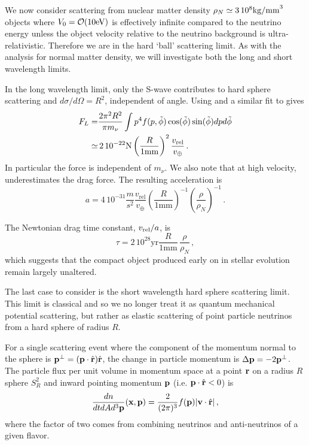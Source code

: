We now consider scattering from nuclear matter density $\rho_N\simeq 3 \, 10^{8}{\rm kg/mm}^3$ objects where $V_0={\cal O}(10\text{eV})$ is effectively infinite compared to the neutrino energy unless the object velocity relative to the neutrino background is ultra-relativistic.  Therefore we are in the hard `ball' scattering limit. As with the analysis for normal matter density, we will investigate both the long and short wavelength limits. 

In the long wavelength limit, only the S-wave contributes to hard sphere scattering and $d\sigma/d\Omega=R^2$, independent of angle. Using  and a similar fit to  gives
\begin{align}\label{FLHard}
F_L=&\frac{2\pi^2R^2}{\pi m_\nu} \int p^4 f(p,\tilde\phi) \cos(\tilde\phi) \sin(\tilde\phi) dpd\tilde\phi\notag\\
\simeq &\, 2\, 10^{-22}{\rm N}\left(\frac{R}{1\text{mm}}\right)^2\frac{v_{\text{rel}}}{v_\oplus}\,.
\end{align}
In particular the force is independent of $m_\nu$.  We also note that at high velocity,   underestimates the drag force. The resulting acceleration is
\begin{equation}
a=4\, 10^{-31}\frac{m}{s^2}\frac{v_{\text{rel}} }{v_\oplus}\! \left(\frac{R}{1\text{mm}}\right)^{-1}\!\!\left(\frac{\rho}{\rho_N}\right)^{-1}\,.\!\!
\end{equation}

The Newtonian drag time constant, $v_{\rm rel}/a$, is
\begin{equation}
\tau= 2\,10^{28}\text{yr}\frac{R}{1\text{mm}}\,\frac{\rho}{\rho_N}\,,
\end{equation}
which suggests that the compact object produced early on in stellar evolution remain largely unaltered.

The last case to consider is the short wavelength hard sphere scattering limit.  This limit is classical and so we no longer treat it as quantum mechanical potential scattering, but rather as elastic scattering of point particle neutrinos from a hard sphere of radius $R$.  

For a single scattering event where the component of the momentum normal to the sphere is ${\bf p}^\perp=({\bf p}\cdot \hat {\bf r}) \hat {\bf r}$, the change in particle momentum is  $\Delta {\bf p}=-2{\bf p}^\perp$. The particle flux per unit volume in momentum space at a point ${\bf r}$ on a radius $R$ sphere $S_R^2$ and inward pointing momentum ${\bf p}$ (i.e. ${\bf p}\cdot \hat{\bf  r}<0$) is
\begin{equation}\label{dnClassical}
\frac{dn}{dtd Ad^3{\bf p}}({\bf x},{\bf p})=\frac{2}{(2\pi)^3}f({\bf p})|{\bf v}\cdot \hat{\bf r}|\,,
\end{equation}
where the factor of two comes from combining neutrinos and anti-neutrinos of a given flavor.  

